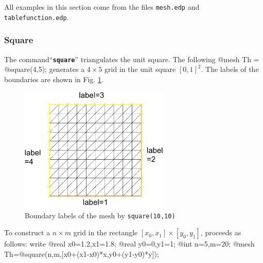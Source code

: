 \documentclass[a4paper,twoside,12pt]{book}
\def\setS#1{#1\label{sec:#1}}
\begin{document}
All examples in this section come from the files \texttt{mesh.edp}
and \texttt{tablefunction.edp}.

\subsubsection{\setS{Square}}

The command``\texttt{\bf square}'' triangulates the unit square.
The following
\bFF
@mesh Th = @square(4,5);
\eFF
generates a $4\times 5$ grid in the unit square $[0,1]^2$. The labels of the boundaries
are shown in Fig. \ref{fig:square}.
\begin{figure}[htbp]
\begin{center}
  \includegraphics[height=6cm]{square}
\end{center}
  \caption{Boundary labels of the mesh by \texttt{square(10,10)}
  \label{fig:square}} 
\end{figure}
To construct a
$n\times m$ grid in the rectangle  $[x_0,x_1]\times [y_0,y_1]$, proceeds as follows:
write
\bFF
  @real x0=1.2,x1=1.8;
  @real y0=0,y1=1;
  @int n=5,m=20;
  @mesh Th=@square(n,m,[x0+(x1-x0)*x,y0+(y1-y0)*y]);

\eFF
\end{document}
